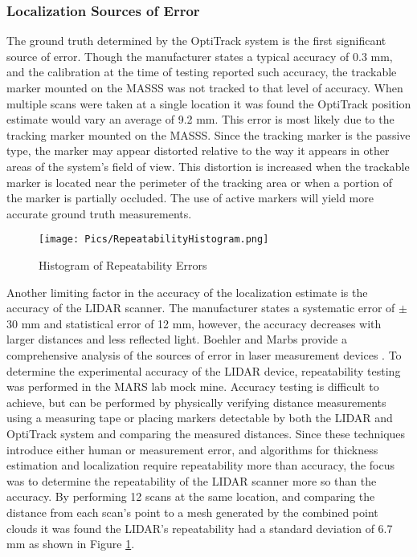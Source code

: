 \subsubsection{Localization Sources of Error}
\label{sec:locsourceerror}

The ground truth determined by the OptiTrack system is the first significant source of error. Though the manufacturer states a typical accuracy of 0.3 mm, and the calibration at the time of testing reported such accuracy, the trackable marker mounted on the MASSS was not tracked to that level of accuracy. When multiple scans were taken at a single location it was found the OptiTrack position estimate would vary an average of 9.2 mm. This error is most likely due to the tracking marker mounted on the MASSS. Since the  tracking marker is the passive type, the marker may appear distorted relative to the way it appears in other areas of the system's field of view. This distortion is increased when the trackable marker is located near the perimeter of the tracking area or when a portion of the marker is partially occluded. The use of active markers will yield more accurate ground truth measurements.\\

\begin{figure}
    \centering
    \texttt{[image: Pics/RepeatabilityHistogram.png]}
    \caption{Histogram of Repeatability Errors}
    \label{fig:repeathist}
\end{figure}

Another limiting factor in the accuracy of the localization estimate is the accuracy of the LIDAR scanner. The manufacturer states a systematic error of $\pm$30 mm and statistical error of 12 mm, however, the accuracy decreases with larger distances and less reflected light. Boehler and Marbs provide a comprehensive analysis of the sources of error in laser measurement devices \cite{checkthebookmarsbar}. To determine the experimental accuracy of the LIDAR device, repeatability testing was performed in the MARS lab mock mine. Accuracy testing is difficult to achieve, but can be performed by physically verifying distance measurements using a measuring tape or placing markers detectable by both the LIDAR and OptiTrack system and comparing the measured distances. Since these techniques introduce either human or measurement error, and algorithms for thickness estimation and localization require repeatability more than accuracy, the focus was to determine the repeatability of the LIDAR scanner more so than the accuracy. By performing 12 scans at the same location, and comparing the distance from each scan's point to a mesh generated by the combined point clouds it was found the LIDAR's repeatability had a standard deviation of 6.7 mm as shown in Figure \ref{fig:repeathist}.\\


